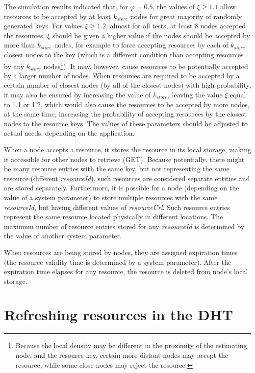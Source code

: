 The simulation results indicated that, for $\varphi=0.5$, the values of $\xi \geq 1.1$ allow resources to be accepted by at least $k_{store}$ nodes for great majority of randomly generated keys. For values $\xi \geq 1.2$, almost for all tests, at least 8 nodes accepted the resources. $\xi$ should be given a higher value if the nodes should be accepted by more than $k_{store}$ nodes, for example to force accepting resources by each of $k_{store}$ closest nodes to the key (which is a different condition than accepting resources by any $k_{store}$ nodes\footnote{Because the local density may be different in the proximity of the estimating node, and the resource key, certain more distant nodes may accept the resource, while some close nodes may reject the resource.}). It may, however, cause resources to be potentially accepted by a larger number of nodes. When resources are required to be accepted by a certain number of closest nodes (by all of the closest nodes) with high probability, it may also be ensured by increasing the value of $k_{store}$, leaving the value $\xi$ equal to 1.1 or 1.2, which would also cause the resources to be accepted by more nodes, at the same time, increasing the probability of accepting resources by the closest nodes to the resource keys. The values of these parameters should be adjusted to actual needs, depending on the application.

When a node accepts a resource, it stores the resource in its local storage, making it accessible for other nodes to retrieve (GET). Because potentially, there might be many resource entries with the same key, but not representing the same resource (different \emph{resourceId}), such resources are considered separate entities and are stored separately. Furthermore, it is possible for a node (depending on the value of a system parameter) to store multiple resources with the same \emph{resourceId}, but having different values of \emph{resourceUrl}. Such resource entries represent the same resource located physically in different locations. The maximum number of resource entries stored for any \emph{resourceId} is determined by the value of another system parameter.

When resources are being stored by nodes, they are assigned expiration times (the resource validity time is determined by a system parameter). After the expiration time elapses for any resource, the resource is deleted from node's local storage.



\section{Refreshing resources in the DHT}

